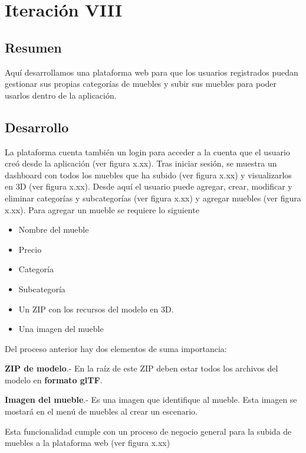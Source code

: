 \section{Iteración VIII}
\subsection{Resumen}
Aquí desarrollamos una plataforma web para que los usuarios registrados puedan gestionar sus propias categorías de muebles y subir sus muebles para poder usarlos dentro de la aplicación.

\subsection{Desarrollo}
La plataforma cuenta también un login para acceder a la cuenta que el usuario creó desde la aplicación (ver figura x.xx). Tras iniciar sesión, se muestra un dashboard con todos los muebles que ha subido (ver figura x.xx) y visualizarlos en 3D (ver figura x.xx). Desde aquí el usuario puede agregar, crear, modificar y eliminar categorías y subcategorías (ver figura x.xx) y agregar muebles (ver figura x.xx). Para agregar un mueble se requiere lo siguiente
\begin{itemize}
	\item Nombre del mueble
	\item Precio
	\item Categoría
	\item Subcategoría
	\item Un ZIP con los recursos del modelo en 3D.
	\item Una imagen del  mueble
\end{itemize}
Del proceso anterior hay dos elementos de suma importancia:\par
\textbf{ZIP de modelo}.- En la raíz de este ZIP deben estar todos los archivos del modelo en \textbf{formato glTF}. \par
\textbf{Imagen del mueble}.- Es una imagen que identifique al mueble. Esta imagen se mostará en el menú de muebles al crear un escenario.\par

Esta funcionalidad cumple con un proceso de negocio general para la subida de muebles a la plataforma web (ver figura x.xx)

